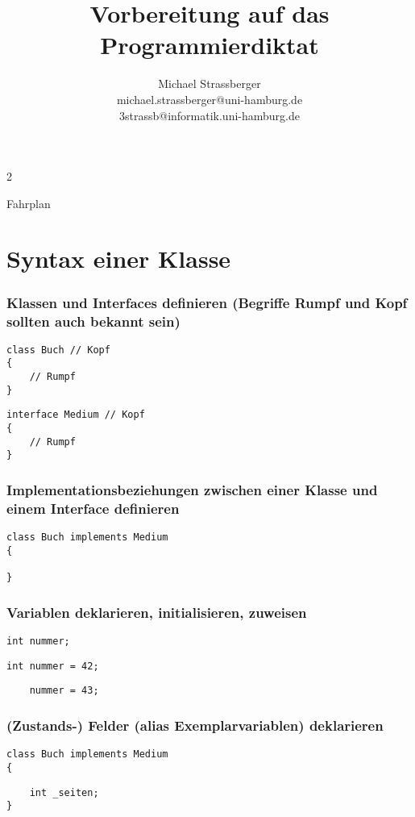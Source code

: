 \documentclass[mathserif]{beamer}
\title{Vorbereitung auf das Programmierdiktat}
\author{Michael Strassberger\\michael.strassberger@uni-hamburg.de\\3strassb@informatik.uni-hamburg.de}
\begin{document}
\begin{frame}
\titlepage
\end{frame}2

\begin{frame}{Fahrplan}
\tableofcontents
\end{frame}

\section{Syntax einer Klasse}

\begin{frame}[fragile]
\frametitle{Klassen und Interfaces definieren (Begriffe Rumpf und Kopf sollten auch bekannt sein)}
\pause
    \begin{lstlisting}
class Buch // Kopf
{
    // Rumpf
}
    \end{lstlisting}
\pause
    \begin{lstlisting}
interface Medium // Kopf
{
    // Rumpf
}
    \end{lstlisting}
\end{frame}

\begin{frame}[fragile]
\frametitle{Implementationsbeziehungen zwischen einer Klasse und einem Interface definieren}
\pause
    \begin{lstlisting}
class Buch implements Medium 
{

}
    \end{lstlisting}
\end{frame}

\begin{frame}[fragile]
\frametitle{Variablen deklarieren, initialisieren, zuweisen}
\pause
    \begin{lstlisting}
int nummer;
    \end{lstlisting}
\pause
    \begin{lstlisting}
int nummer = 42;
    \end{lstlisting}
\pause
    \begin{lstlisting}
    nummer = 43;
    \end{lstlisting}
\end{frame}

\begin{frame}[fragile]
\frametitle{(Zustands-) Felder (alias Exemplarvariablen) deklarieren}
    \begin{lstlisting}
class Buch implements Medium 
{
    \end{lstlisting}
\pause
    \begin{lstlisting}
    int _seiten;
}
    \end{lstlisting}
\end{frame}
\end{document}
